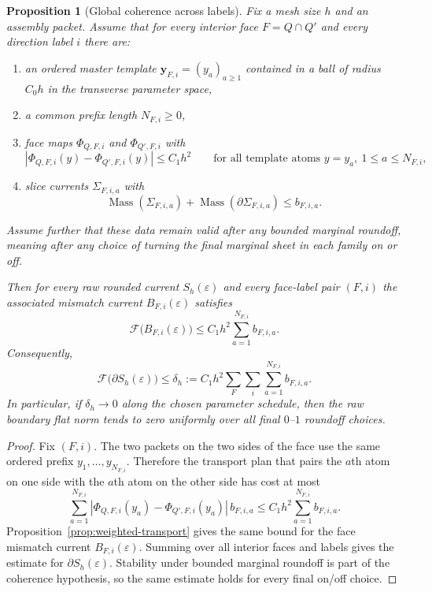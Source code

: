 \documentclass[11pt]{article}
\numberwithin{equation}{section}
\theoremstyle{plain}
\newtheorem{proposition}[theorem]{Proposition}
\theoremstyle{definition}
\theoremstyle{remark}
\DeclareMathOperator{\Mass}{Mass}
\newcommand{\calF}{\mathcal{F}}
\begin{document}
\begin{proposition}[Global coherence across labels]\label{prop:global-coherence}
Fix a mesh size $h$ and an assembly packet.  Assume that for every interior face $F=Q\cap Q'$ and every direction label $i$ there are:
\begin{enumerate}
\item an ordered master template $\mathbf y_{F,i}=(y_a)_{a\ge 1}$ contained in a ball of radius $C_0 h$ in the transverse parameter space,
\item a common prefix length $N_{F,i}\ge 0$,
\item face maps $\Phi_{Q,F,i}$ and $\Phi_{Q',F,i}$ with
\[
|\Phi_{Q,F,i}(y)-\Phi_{Q',F,i}(y)|\le C_1 h^2
\qquad
\text{for all template atoms } y=y_a,\ 1\le a\le N_{F,i},
\]
\item slice currents $\Sigma_{F,i,a}$ with
\[
\Mass(\Sigma_{F,i,a})+\Mass(\partial\Sigma_{F,i,a})\le b_{F,i,a}.
\]
\end{enumerate}
Assume further that these data remain valid after any bounded marginal roundoff, meaning after any choice of turning the final marginal sheet in each family on or off.

Then for every raw rounded current $S_h(\varepsilon)$ and every face-label pair $(F,i)$ the associated mismatch current $B_{F,i}(\varepsilon)$ satisfies
\[
\calF\bigl(B_{F,i}(\varepsilon)\bigr)
\le C_1 h^2\sum_{a=1}^{N_{F,i}} b_{F,i,a}.
\]
Consequently,
\[
\calF\bigl(\partial S_h(\varepsilon)\bigr)
\le
\delta_h:=C_1 h^2\sum_{F}\sum_i\sum_{a=1}^{N_{F,i}} b_{F,i,a}.
\]
In particular, if $\delta_h\to 0$ along the chosen parameter schedule, then the raw boundary flat norm tends to zero uniformly over all final $0$--$1$ roundoff choices.
\end{proposition}

\begin{proof}
Fix $(F,i)$.  The two packets on the two sides of the face use the same ordered prefix $y_1,\dots,y_{N_{F,i}}$.  Therefore the transport plan that pairs the $a$th atom on one side with the $a$th atom on the other side has cost at most
\[
\sum_{a=1}^{N_{F,i}} |\Phi_{Q,F,i}(y_a)-\Phi_{Q',F,i}(y_a)|\,b_{F,i,a}
\le C_1 h^2\sum_{a=1}^{N_{F,i}} b_{F,i,a}.
\]
Proposition~\ref{prop:weighted-transport} gives the same bound for the face mismatch current $B_{F,i}(\varepsilon)$.  Summing over all interior faces and labels gives the estimate for $\partial S_h(\varepsilon)$.  Stability under bounded marginal roundoff is part of the coherence hypothesis, so the same estimate holds for every final on/off choice.
\end{proof}
\end{document}
